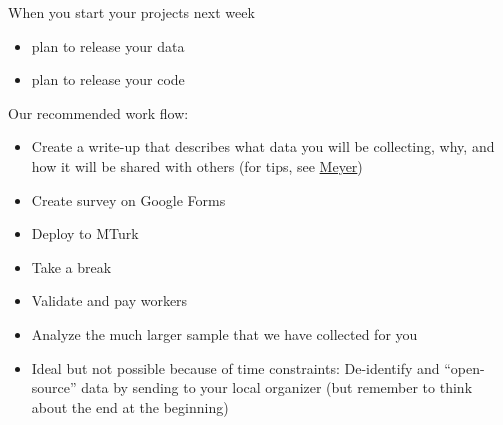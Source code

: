 \documentclass[aspectratio=169]{beamer}
\begin{document}
%
%
%
\begin{frame}

When you start your projects next week
\begin{itemize}
\item plan to release your data
\item plan to release your code
\end{itemize}

\end{frame}
\begin{frame}

Our recommended work flow:
\begin{itemize}
\item Create a write-up that describes what data you will be collecting, why, and how it will be shared with others (for tips, see \href{https://doi.org/10.1177/2515245917747656}{Meyer})
\item Create survey on Google Forms
\item Deploy to MTurk
\item Take a break
\item Validate and pay workers
\item Analyze the much larger sample that we have collected for you
\item Ideal but not possible because of time constraints: De-identify and ``open-source'' data by sending to your local organizer (but remember to think about the end at the beginning)
\end{itemize}

\end{frame}
\end{document}
